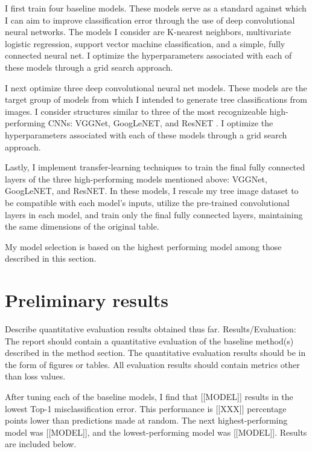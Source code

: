 \documentclass[10pt,twocolumn,letterpaper]{article}
\begin{document}
I first train four baseline models. These models serve as a standard against which I can aim to improve classification error through the use of deep convolutional neural networks. The models I consider are K-nearest neighbors, multivariate logistic regression, support vector machine classification, and a simple, fully connected neural net. I optimize the hyperparameters associated with each of these models through a grid search approach. 

I next optimize three deep convolutional neural net models. These models are the target group of models from which I intended to generate tree classifications from images. I consider structures similar to three of the most recognizeable high-performing CNNs: VGGNet, GoogLeNET, and ResNET \cite{VGGNet, GoogLeNET, ResNET}. I optimize the hyperparameters associated with each of these models through a grid search approach.

Lastly, I implement transfer-learning techniques to train the final fully connected layers of the three high-performing models mentioned above: VGGNet, GoogLeNET, and ResNET. In these models, I rescale my tree image dataset to be compatible with each model's inputs, utilize the pre-trained convolutional layers in each model, and train only the final fully connected layers, maintaining the same dimensions of the original table.

My model selection is based on the highest performing model among those described in this section.


\section{Preliminary results}

Describe quantitative evaluation results obtained thus far. Results/Evaluation: The report should contain a quantitative evaluation of the baseline method(s) described in the method section. The quantitative evaluation results should be in the form of figures or tables. All evaluation results should contain metrics other than loss values.

After tuning each of the baseline models, I find that [[MODEL]] results in the lowest Top-1 misclassification error. This performance is [[XXX]] percentage points lower than predictions made at random. The next highest-performing model was [[MODEL]], and the lowest-performing model was [[MODEL]]. Results are included below.
\end{document}
